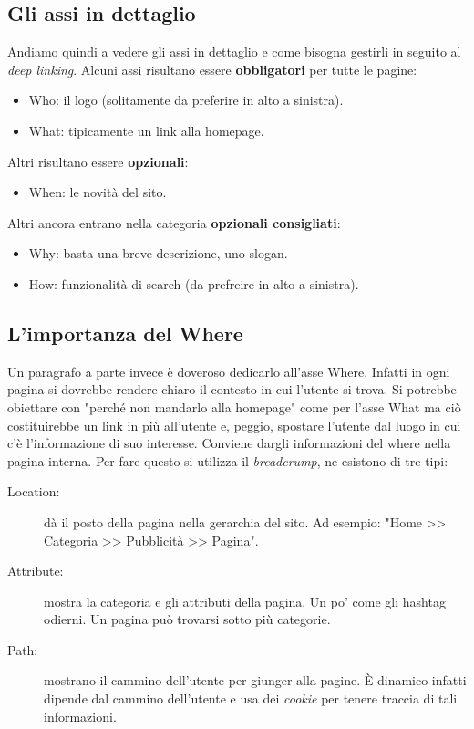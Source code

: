 		\subsection{Gli assi in dettaglio}
			Andiamo quindi a vedere gli assi in dettaglio e come bisogna gestirli in seguito al \emph{deep linking}.
			Alcuni assi risultano essere \textbf{obbligatori} per tutte le pagine:
			\begin{itemize}
				\item Who: il logo (solitamente da preferire in alto a sinistra).
				\item What: tipicamente un link alla homepage.
			\end{itemize}
			Altri risultano essere \textbf{opzionali}:
			\begin{itemize}
				\item When: le novità del sito.
			\end{itemize}
			Altri ancora entrano nella categoria \textbf{opzionali consigliati}:
			\begin{itemize}
				\item Why: basta una breve descrizione, uno slogan.
				\item How: funzionalità di search (da prefreire in alto a sinistra).
			\end{itemize}
		
		\subsection{L'importanza del Where}
			Un paragrafo a parte invece è doveroso dedicarlo all'asse Where. Infatti in ogni pagina si dovrebbe rendere chiaro il contesto in cui l'utente si trova. Si potrebbe obiettare con "perché non mandarlo alla homepage" come per l'asse What ma ciò costituirebbe un link in più all'utente e, peggio, spostare l'utente dal luogo in cui c'è l'informazione di suo interesse. Conviene dargli informazioni del where nella pagina interna.
				Per fare questo si utilizza il \emph{breadcrump}, ne esistono di tre tipi:
				\begin{description}
					\item[Location:] dà il posto della pagina nella gerarchia del sito. Ad esempio: "Home >> Categoria >> Pubblicità >> Pagina".
					\item[Attribute:] mostra la categoria e gli attributi della pagina. Un po' come gli hashtag odierni. Un pagina può trovarsi sotto più categorie.
					\item[Path:] mostrano il cammino dell'utente per giunger alla pagine. È dinamico infatti dipende dal cammino dell'utente e usa dei \emph{cookie} per tenere traccia di tali informazioni.
				\end{description}
				
